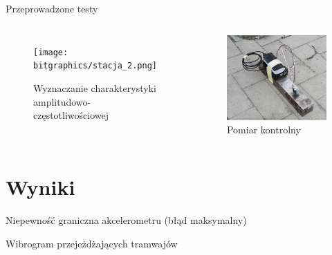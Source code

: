\documentclass[aspectratio=1610,polish]{beamer} %
\begin{document}
  \begin{frame}{Przeprowadzone testy}
    \begin{columns}
      \begin{figure}
        \texttt{[image: bitgraphics/stacja\_2.png]}
        \caption{Wyznaczanie charakterystyki amplitudowo-częstotliwościowej}
      \end{figure}
      \begin{figure}
        \includegraphics[width=\textwidth]{bitgraphics/stacja_1.png}
        \caption{Pomiar kontrolny}
      \end{figure}
    \end{columns}
  \end{frame}
  \section{Wyniki}
  \begin{frame}{Niepewność graniczna akcelerometru (błąd maksymalny)}
    \begin{figure}
      
    \end{figure}
  \end{frame}
  \begin{frame}{Wibrogram przejeżdżających tramwajów}
    \begin{figure}
      
    \end{figure}
  \end{frame}
\end{document}

